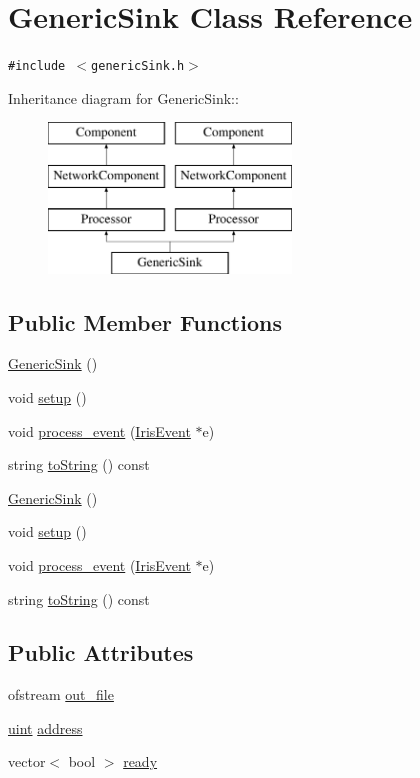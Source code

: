 \hypertarget{classGenericSink}{
\section{GenericSink Class Reference}
\label{classGenericSink}
}
{\tt \#include $<$genericSink.h$>$}

Inheritance diagram for GenericSink::\begin{figure}[H]
\begin{center}
\leavevmode
\includegraphics[height=4cm]{classGenericSink}
\end{center}
\end{figure}
\subsection*{Public Member Functions}
\begin{CompactItemize}
\item 
\hyperlink{classGenericSink_6652e97f87a0a6a93dc979a167d2db8b}{GenericSink} ()
\item 
void \hyperlink{classGenericSink_0ed90ea7e6e66cfa8b9935b50ef0051d}{setup} ()
\item 
void \hyperlink{classGenericSink_a0beb58f52adfe869ba47f4b51537409}{process\_\-event} (\hyperlink{classIrisEvent}{IrisEvent} $\ast$e)
\item 
string \hyperlink{classGenericSink_a1703a08208816130a4ee2f4d4a8334f}{toString} () const 
\item 
\hyperlink{classGenericSink_6652e97f87a0a6a93dc979a167d2db8b}{GenericSink} ()
\item 
void \hyperlink{classGenericSink_0ed90ea7e6e66cfa8b9935b50ef0051d}{setup} ()
\item 
void \hyperlink{classGenericSink_a0beb58f52adfe869ba47f4b51537409}{process\_\-event} (\hyperlink{classIrisEvent}{IrisEvent} $\ast$e)
\item 
string \hyperlink{classGenericSink_a1703a08208816130a4ee2f4d4a8334f}{toString} () const 
\end{CompactItemize}
\subsection*{Public Attributes}
\begin{CompactItemize}
\item 
ofstream \hyperlink{classGenericSink_6f54713b76e768ddf16799d4921b497f}{out\_\-file}
\item 
\hyperlink{outputBuffer_8h_91ad9478d81a7aaf2593e8d9c3d06a14}{uint} \hyperlink{classGenericSink_ccb1d47a4bec1322b3e8c996933e4aaf}{address}
\item 
vector$<$ bool $>$ \hyperlink{classGenericSink_ad331b8bfcbeb647f237e5b489868a94}{ready}
\end{CompactItemize}


